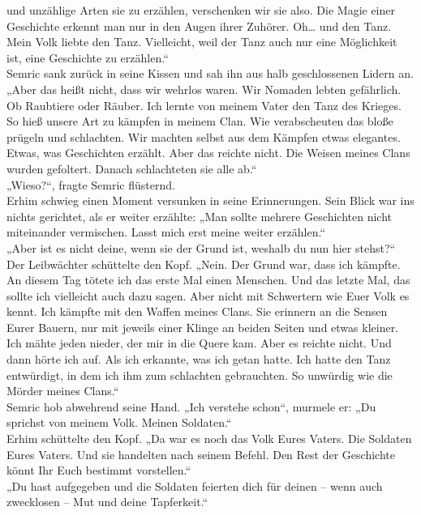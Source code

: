 und unzählige Arten sie zu erzählen, verschenken wir sie also. Die Magie einer Geschichte erkennt 
man nur in den Augen ihrer Zuhörer. Oh… und den Tanz. Mein Volk liebte den Tanz. Vielleicht, weil 
der Tanz auch nur eine Möglichkeit ist, eine Geschichte zu erzählen.“\\
Semric sank zurück in seine Kissen und sah ihn aus halb geschlossenen Lidern an. \\
„Aber das heißt nicht, dass wir wehrlos waren. Wir Nomaden lebten gefährlich. Ob Raubtiere oder 
Räuber. Ich lernte von meinem Vater den Tanz des Krieges. So hieß unsere Art zu kämpfen in meinem 
Clan. Wie verabscheuten das bloße prügeln und schlachten. Wir machten selbst aus dem Kämpfen etwas 
elegantes. Etwas, was Geschichten erzählt. Aber das reichte nicht. Die Weisen meines Clans wurden 
gefoltert. Danach schlachteten sie alle ab.“\\
„Wieso?“, fragte Semric flüsternd.\\
Erhim schwieg einen Moment versunken in seine Erinnerungen. Sein Blick war ins nichts gerichtet, als 
er weiter erzählte: „Man sollte mehrere Geschichten nicht miteinander vermischen. Lasst mich erst 
meine weiter erzählen.“\\
„Aber ist es nicht deine, wenn sie der Grund ist, weshalb du nun hier stehst?“\\
Der Leibwächter schüttelte den Kopf. „Nein. Der Grund war, dass ich kämpfte. An diesem Tag tötete 
ich das erste Mal einen Menschen. Und das letzte Mal, das sollte ich vielleicht auch dazu sagen. 
Aber nicht mit Schwertern wie Euer Volk es kennt. Ich kämpfte mit den Waffen meines Clans. Sie 
erinnern an die Sensen Eurer Bauern, nur mit jeweils einer Klinge an beiden Seiten und etwas 
kleiner. Ich mähte jeden nieder, der mir in die Quere kam. Aber es reichte nicht. Und dann hörte ich 
auf. Als ich erkannte, was ich getan hatte. Ich hatte den Tanz entwürdigt, in dem ich ihm zum 
schlachten gebrauchten. So unwürdig wie die Mörder meines Clans.“\\
Semric hob abwehrend seine Hand. „Ich verstehe schon“, murmele er: „Du sprichst von meinem Volk. 
Meinen Soldaten.“\\
Erhim schüttelte den Kopf. „Da war es noch das Volk Eures Vaters. Die Soldaten Eures Vaters. Und sie 
handelten nach seinem Befehl. Den Rest der Geschichte könnt Ihr Euch bestimmt vorstellen.“\\
„Du hast aufgegeben und die Soldaten feierten dich für deinen – wenn auch zwecklosen – Mut und deine 
Tapferkeit.“\\
